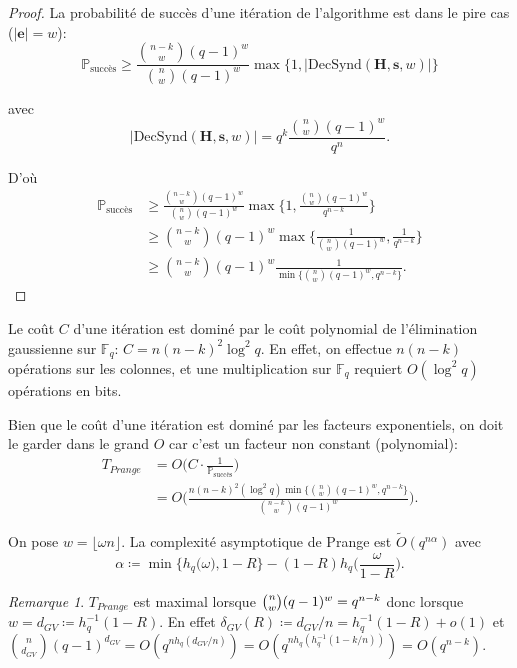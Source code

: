 \documentclass{scrartcl}[a4paper,10pt,headings=small,footinclude=false]
\theoremstyle{definition}
\theoremstyle{remark}
\newtheorem*{remark}{Remarque}
\begin{document}
\begin{proof}
La probabilité de succès d'une itération de l'algorithme est dans le pire cas ($|\textbf{e}|=w$):
\[ \mathbb{P}_{\text{succès}} \geq \frac{\binom{n-k}{w}(q-1)^w}{\binom{n}{w}(q-1)^w} \max \{1, |\text{DecSynd}(\textbf{H},\textbf{s},w)|\}\]

avec 
\[ |\text{DecSynd}(\textbf{H},\textbf{s},w)| = q^k \frac{\binom{n}{w}(q-1)^w}{q^n}. \]

D'où
\begin{align*}
    \mathbb{P}_{\text{succès}} &\geq \frac{\binom{n-k}{w}(q-1)^w}{\binom{n}{w}(q-1)^w} \max \Big\{1,\frac{\binom{n}{w}(q-1)^w}{q^{n-k}}\Big\}\\
    &\geq \binom{n-k}{w}(q-1)^w \max \Big\{\frac{1}{\binom{n}{w}(q-1)^w},\frac{1}{q^{n-k}}\Big\}\\
    &\geq \binom{n-k}{w}(q-1)^w \frac{1}{\min \{\binom{n}{w}(q-1)^w,q^{n-k}\}}.
\end{align*}
\end{proof}

Le coût $C$ d'une itération est dominé par le coût polynomial de l'élimination gaussienne sur $\mathbb{F}_q$: $C=n(n-k)^2\log^2 q$. En effet, on effectue $n(n-k)$ opérations sur les colonnes, et une multiplication sur $\mathbb{F}_q$ requiert $O(\log^2 q)$ opérations en bits.

Bien que le coût d'une itération est dominé par les facteurs exponentiels, on doit le garder dans le grand $O$ car c'est un facteur non constant (polynomial):
\begin{align*}
    T_{Prange} &= O\Big(C \cdot \frac{1}{\mathbb{P}_{\text{succès}}}\Big)\\
&= O\Bigg(\frac{n(n-k)^2(\log^2 q)\min \big\{\binom{n}{w}(q-1)^w,q^{n-k}\big\}}{\binom{n-k}{w}(q-1)^w} \Bigg).
\end{align*}

On pose $w=\lfloor \omega n \rfloor$.
La complexité asymptotique de Prange est $\tilde{O}(q^{n\alpha})$
avec \[\alpha\coloneq \min\big\{ h_q\big(\omega\big), 1-R \big\} - ( 1-R)h_q\bigg(\frac{\omega}{1-R}\bigg).\]

\begin{remark}
$T_{Prange}$ est maximal lorsque $\tbinom{n}{w}(q-1)^w=q^{n-k}$ donc lorsque $w=d_{GV}\coloneq h_q^{-1}(1-R)$. En effet $\delta_{GV}(R)\coloneq d_{GV}/n=h_q^{-1}(1-R)+o(1)$ et $\binom{n}{d_{GV}}(q-1)^{d_{GV}}=O(q^{nh_q(d_{GV}/n)})=O(q^{nh_q(h_q^{-1}(1-k/n))})=O(q^{n-k})$. %
\end{remark}
\end{document}
